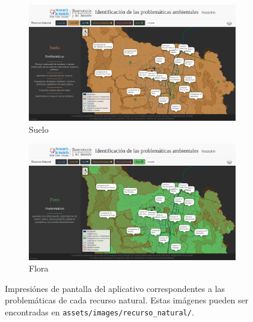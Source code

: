 \documentclass[11pt,letterpaper]{article}
\begin{document}
\begin{figure}[ht!]
\begin{subfigure}{.49\textwidth}
	\includegraphics[width=\textwidth]{../assets/images/recurso_natural/recurso_suelo.png}
	\caption{Suelo}\label{fig:rSuelo}
\end{subfigure}	
\hfill
\begin{subfigure}{.49\textwidth}
	\includegraphics[width=\textwidth]{../assets/images/recurso_natural/recurso_flora.png}
	\caption{Flora}\label{fig:rFlora}
\end{subfigure}
\caption{Impresiónes de pantalla del aplicativo correspondentes a las problemáticas de cada recurso natural. Estas imágenes pueden ser encontradas en {\tt assets/images/recurso\_natural/}.}\label{fig:recurso}
\end{figure}


\newpage


\end{document}
